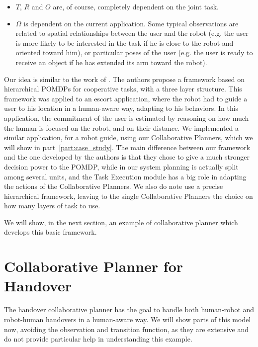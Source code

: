 \begin{itemize}
	\item $T$, $R$ and $O$ are, of course, completely dependent on the joint task.
	\item $\Omega$ is dependent on the current application. Some typical observations are related to spatial relationships between the user and the robot (e.g. the user is more likely to be interested in the task if he is close to the robot and oriented toward him), or particular poses of the user (e.g. the user is ready to receive an object if he has extended its arm toward the robot).

\end{itemize}

Our idea is similar to the work of \cite{ferrari2015hierarchical}. The authors propose a framework based on hierarchical POMDPs for cooperative tasks, with a three layer structure. This framework was applied to an escort application, where the robot had to guide a user to his location in a human-aware way, adapting to his behaviors. In this application, the commitment of the user is estimated by reasoning on how much the human is focused on the robot, and on their distance.
We implemented a similar application, for a robot guide, using our Collaborative Planners, which we will show in part~\ref{part:case_study}. The main difference between our framework and the one developed by the authors is that they chose to give a much stronger decision power to the POMDP, while in our system planning is actually split among several units, and the Task Execution module has a big role in adapting the actions of the Collaborative Planners. We also do note use a precise hierarchical framework, leaving to the single Collaborative Planners the choice on how many layers of task to use.

We will show, in the next section, an example of collaborative planner which develops this basic framework.

\section{Collaborative Planner for Handover}
\label{sec:task_execution-handover}
The handover collaborative planner has the goal to handle both human-robot and robot-human handovers in a human-aware way. We will show parts of this model now, avoiding the observation and transition function, as they are extensive and do not provide particular help in understanding this example.

